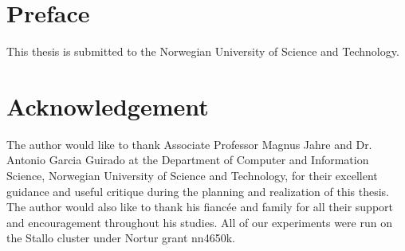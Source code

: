 \section*{Preface}

This thesis is submitted to the Norwegian University of Science and Technology.

\section*{Acknowledgement}
The author would like to thank Associate Professor Magnus
Jahre and Dr. Antonio Garcia Guirado at the Department of Computer and Information Science, Norwegian University of Science and Technology, for their excellent guidance and useful critique during the planning and realization of this thesis.
The author would also like to thank his fiancée and family for all their support and encouragement throughout his studies.
All of our experiments were run on the Stallo cluster under Nortur grant nn4650k.